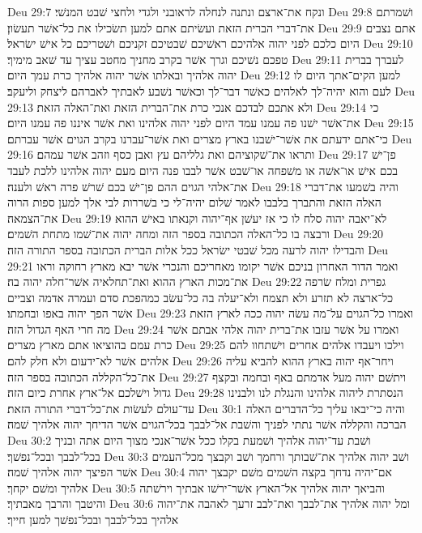 Deu 29:7  ונקח את־ארצם ונתנה לנחלה לראובני ולגדי ולחצי שׁבט המנשׁי׃
Deu 29:8  ושׁמרתם את־דברי הברית הזאת ועשׂיתם אתם למען תשׂכילו את כל־אשׁר תעשׂון׃
Deu 29:9  אתם נצבים היום כלכם לפני יהוה אלהיכם ראשׁיכם שׁבטיכם זקניכם ושׁטריכם כל אישׁ ישׂראל׃
Deu 29:10  טפכם נשׁיכם וגרך אשׁר בקרב מחניך מחטב עציך עד שׁאב מימיך׃
Deu 29:11  לעברך בברית יהוה אלהיך ובאלתו אשׁר יהוה אלהיך כרת עמך היום׃
Deu 29:12  למען הקים־אתך היום לו לעם והוא יהיה־לך לאלהים כאשׁר דבר־לך וכאשׁר נשׁבע לאבתיך לאברהם ליצחק וליעקב׃
Deu 29:13  ולא אתכם לבדכם אנכי כרת את־הברית הזאת ואת־האלה הזאת׃
Deu 29:14  כי את־אשׁר ישׁנו פה עמנו עמד היום לפני יהוה אלהינו ואת אשׁר איננו פה עמנו היום׃
Deu 29:15  כי־אתם ידעתם את אשׁר־ישׁבנו בארץ מצרים ואת אשׁר־עברנו בקרב הגוים אשׁר עברתם׃
Deu 29:16  ותראו את־שׁקוציהם ואת גלליהם עץ ואבן כסף וזהב אשׁר עמהם׃
Deu 29:17  פן־ישׁ בכם אישׁ או־אשׁה או משׁפחה או־שׁבט אשׁר לבבו פנה היום מעם יהוה אלהינו ללכת לעבד את־אלהי הגוים ההם פן־ישׁ בכם שׁרשׁ פרה ראשׁ ולענה׃
Deu 29:18  והיה בשׁמעו את־דברי האלה הזאת והתברך בלבבו לאמר שׁלום יהיה־לי כי בשׁררות לבי אלך למען ספות הרוה את־הצמאה׃
Deu 29:19  לא־יאבה יהוה סלח לו כי אז יעשׁן אף־יהוה וקנאתו באישׁ ההוא ורבצה בו כל־האלה הכתובה בספר הזה ומחה יהוה את־שׁמו מתחת השׁמים׃
Deu 29:20  והבדילו יהוה לרעה מכל שׁבטי ישׂראל ככל אלות הברית הכתובה בספר התורה הזה׃
Deu 29:21  ואמר הדור האחרון בניכם אשׁר יקומו מאחריכם והנכרי אשׁר יבא מארץ רחוקה וראו את־מכות הארץ ההוא ואת־תחלאיה אשׁר־חלה יהוה בה׃
Deu 29:22  גפרית ומלח שׂרפה כל־ארצה לא תזרע ולא תצמח ולא־יעלה בה כל־עשׂב כמהפכת סדם ועמרה אדמה וצביים אשׁר הפך יהוה באפו ובחמתו׃
Deu 29:23  ואמרו כל־הגוים על־מה עשׂה יהוה ככה לארץ הזאת מה חרי האף הגדול הזה׃
Deu 29:24  ואמרו על אשׁר עזבו את־ברית יהוה אלהי אבתם אשׁר כרת עמם בהוציאו אתם מארץ מצרים׃
Deu 29:25  וילכו ויעבדו אלהים אחרים וישׁתחוו להם אלהים אשׁר לא־ידעום ולא חלק להם׃
Deu 29:26  ויחר־אף יהוה בארץ ההוא להביא עליה את־כל־הקללה הכתובה בספר הזה׃
Deu 29:27  ויתשׁם יהוה מעל אדמתם באף ובחמה ובקצף גדול וישׁלכם אל־ארץ אחרת כיום הזה׃
Deu 29:28  הנסתרת ליהוה אלהינו והנגלת לנו ולבנינו עד־עולם לעשׂות את־כל־דברי התורה הזאת׃
Deu 30:1  והיה כי־יבאו עליך כל־הדברים האלה הברכה והקללה אשׁר נתתי לפניך והשׁבת אל־לבבך בכל־הגוים אשׁר הדיחך יהוה אלהיך שׁמה׃
Deu 30:2  ושׁבת עד־יהוה אלהיך ושׁמעת בקלו ככל אשׁר־אנכי מצוך היום אתה ובניך בכל־לבבך ובכל־נפשׁך׃
Deu 30:3  ושׁב יהוה אלהיך את־שׁבותך ורחמך ושׁב וקבצך מכל־העמים אשׁר הפיצך יהוה אלהיך שׁמה׃
Deu 30:4  אם־יהיה נדחך בקצה השׁמים משׁם יקבצך יהוה אלהיך ומשׁם יקחך׃
Deu 30:5  והביאך יהוה אלהיך אל־הארץ אשׁר־ירשׁו אבתיך וירשׁתה והיטבך והרבך מאבתיך׃
Deu 30:6  ומל יהוה אלהיך את־לבבך ואת־לבב זרעך לאהבה את־יהוה אלהיך בכל־לבבך ובכל־נפשׁך למען חייך׃
